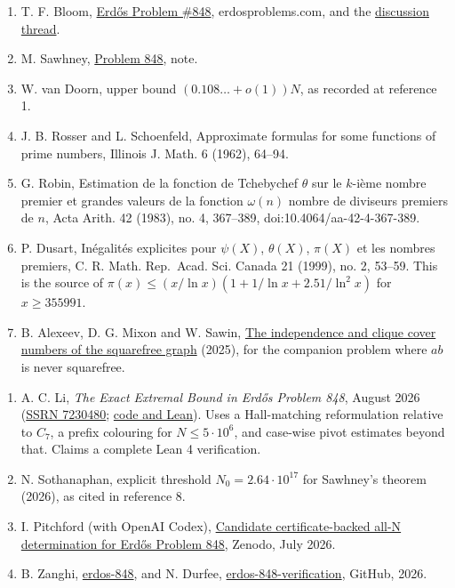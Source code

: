 \documentclass[
  11pt,
]{article}
\providecommand{\tightlist}{%
  \setlength{\itemsep}{0pt}\setlength{\parskip}{0pt}}
\begin{document}
\begin{enumerate}
\def\labelenumi{\arabic{enumi}.}
\tightlist
\item
  T. F. Bloom, \href{https://www.erdosproblems.com/848}{Erdős Problem
  \#848}, erdosproblems.com, and the
  \href{https://www.erdosproblems.com/forum/thread/848}{discussion
  thread}.
\item
  M. Sawhney,
  \href{https://www.math.columbia.edu/~msawhney/Problem_848.pdf}{Problem
  848}, note.
\item
  W. van Doorn, upper bound \((0.108\dots + o(1))N\), as recorded at
  reference 1.
\item
  J. B. Rosser and L. Schoenfeld, Approximate formulas for some
  functions of prime numbers, Illinois J. Math. 6 (1962), 64--94.
\item
  G. Robin, Estimation de la fonction de Tchebychef \(\theta\) sur le
  \(k\)-ième nombre premier et grandes valeurs de la fonction
  \(\omega(n)\) nombre de diviseurs premiers de \(n\), Acta Arith. 42
  (1983), no. 4, 367--389, doi:10.4064/aa-42-4-367-389.
\item
  P. Dusart, Inégalités explicites pour \(\psi(X)\), \(\theta(X)\),
  \(\pi(X)\) et les nombres premiers, C. R. Math. Rep.~Acad. Sci. Canada
  21 (1999), no. 2, 53--59. This is the source of
  \(\pi(x) \le (x/\ln x)(1 + 1/\ln x + 2.51/\ln^2 x)\) for
  \(x \ge 355991\).
\item
  B. Alexeev, D. G. Mixon and W. Sawin,
  \href{https://arxiv.org/abs/2507.01928}{The independence and clique
  cover numbers of the squarefree graph} (2025), for the companion
  problem where \(ab\) is never squarefree.
\end{enumerate}

\begin{enumerate}
\def\labelenumi{\arabic{enumi})}
\setcounter{enumi}{7}
\tightlist
\item
  A. C. Li, \emph{The Exact Extremal Bound in Erdős Problem 848}, August
  2026
  (\href{https://papers.ssrn.com/sol3/papers.cfm?abstract_id=7230480}{SSRN
  7230480};
  \href{https://github.com/crabsatellite/erdos-848-squarefree-product}{code
  and Lean}). Uses a Hall-matching reformulation relative to \(C_7\), a
  prefix colouring for \(N \le 5\cdot 10^{6}\), and case-wise pivot
  estimates beyond that. Claims a complete Lean 4 verification.
\item
  N. Sothanaphan, explicit threshold \(N_0 = 2.64\cdot 10^{17}\) for
  Sawhney's theorem (2026), as cited in reference 8.
\item
  I. Pitchford (with OpenAI Codex),
  \href{https://zenodo.org/records/21647629}{Candidate
  certificate-backed all-N determination for Erdős Problem 848}, Zenodo,
  July 2026.
\item
  B. Zanghi, \href{https://github.com/bzanghi/erdos-848}{erdos-848}, and
  N. Durfee,
  \href{https://github.com/AstroCat93/erdos-848-verification}{erdos-848-verification},
  GitHub, 2026.
\end{enumerate}
\end{document}
